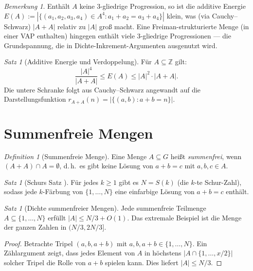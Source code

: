 \documentclass[12pt,a4paper]{amsart}
\theoremstyle{definition}
\theoremstyle{remark}
\newtheorem{satz}[theorem]{Satz}
\newtheorem{bemerkung}[theorem]{Bemerkung}
\newtheorem{definition_de}[theorem]{Definition}
\newcommand{\Z}{\mathbb{Z}}
\begin{document}
\begin{bemerkung}
Enthält $A$ keine 3-gliedrige Progression, so ist die additive Energie
$E(A) := |\{(a_1, a_2, a_3, a_4) \in A^4: a_1+a_2=a_3+a_4\}|$ klein, was (via
Cauchy--Schwarz) $|A + A|$ relativ zu $|A|$ groß macht. Eine Freiman-strukturierte
Menge (in einer VAP enthalten) hingegen enthält viele 3-gliedrige Progressionen —
die Grundspannung, die in Dichte-Inkrement-Argumenten ausgenutzt wird.
\end{bemerkung}

\begin{satz}[Additive Energie und Verdoppelung]\label{satz:energie}
Für $A \subseteq \Z$ gilt:
\[
  \frac{|A|^4}{|A + A|} \leq E(A) \leq |A|^2 \cdot |A+A|.
\]
Die untere Schranke folgt aus Cauchy--Schwarz angewandt auf die
Darstellungsfunktion $r_{A+A}(n) = |\{(a, b): a+b=n\}|$.
\end{satz}

\section{Summenfreie Mengen}\label{sec:summenfrei}

\begin{definition_de}[Summenfreie Menge]
Eine Menge $A \subseteq G$ heißt \emph{summenfrei}, wenn $(A + A) \cap A = \emptyset$,
d.\,h.\ es gibt keine Lösung von $a + b = c$ mit $a, b, c \in A$.
\end{definition_de}

\begin{satz}[Schurs Satz \cite{Schur1916}]\label{satz:schur}
Für jedes $k \geq 1$ gibt es $N = S(k)$ (die $k$-te Schur-Zahl), sodass jede
$k$-Färbung von $\{1, \ldots, N\}$ eine einfarbige Lösung von $a + b = c$ enthält.
\end{satz}

\begin{satz}[Dichte summenfreier Mengen]\label{satz:dichte_summenfrei}
Jede summenfreie Teilmenge $A \subseteq \{1, \ldots, N\}$ erfüllt
$|A| \leq N/3 + O(1)$.
Das extremale Beispiel ist die Menge der ganzen Zahlen in $(N/3, 2N/3]$.
\end{satz}

\begin{proof}
Betrachte Tripel $(a, b, a+b)$ mit $a, b, a+b \in \{1, \ldots, N\}$. Ein
Zählargument zeigt, dass jedes Element von $A$ in höchstens $|A \cap \{1,\ldots,x/2\}|$
solcher Tripel die Rolle von $a+b$ spielen kann. Dies liefert $|A| \leq N/3$.
\end{proof}
\end{document}
